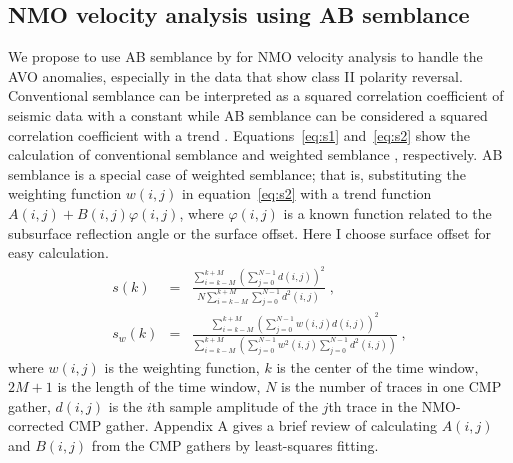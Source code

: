  \subsection{NMO velocity analysis using AB semblance}
 We propose to use AB semblance by \cite{Fomel09} for NMO velocity analysis to handle the AVO anomalies, especially in the data that show class II polarity reversal. Conventional semblance can be interpreted as a squared correlation coefficient of seismic data with a constant while AB semblance can be considered a squared correlation coefficient with a trend \cite[]{Fomel09}.
Equations~\ref{eq:s1} and~\ref{eq:s2} show the
calculation of conventional semblance \cite[]{Neidell71}
and weighted semblance \cite[]{Chen15}, respectively. 
AB semblance is a special case of weighted semblance; that is, substituting the weighting function $w(i,j)$
in equation~\ref{eq:s2} with a trend function $A(i,j)+B(i,j)\varphi(i,j)$, where $\varphi(i,j)$
is a known function related to the subsurface reflection angle or the
surface offset. Here I choose surface offset for easy calculation.
      \begin{eqnarray}
         \label{eq:s1}
          s(k) & = & \frac{\displaystyle\sum_{i=k-M}^{k+M}\left(\displaystyle
          \sum_{j=0}^{N-1}d(i,j)\right)^2}{N\displaystyle\sum_{i=k-M}^{k+M}\displaystyle
          \sum_{j=0}^{N-1}d^2(i,j)} \;, \\
          \label{eq:s2}
          s_{w}(k) & = & \frac{\displaystyle\sum_{i=k-M}^{k+M}\left(\displaystyle
          \sum_{j=0}^{N-1}w(i,j)d(i,j)\right)^2}{\displaystyle\sum_{i=k-M}^{k+M}
          \left(\displaystyle\sum_{j=0}^{N-1}w^2(i,j)\displaystyle\sum_{j=0}^{N-1}d^2(i,j)\right)} \;,
      \end{eqnarray}
where $w(i,j)$ is the weighting function, $k$ is the center of the
time window, $2M+1$ is the length of the time window, $N$ is
the number of traces in one CMP gather, $d(i,j)$ is the $i$th
sample amplitude of the $j$th trace in the NMO-corrected
CMP gather. Appendix A gives a brief review of calculating $A(i,j)$ and $B(i,j)$ from the CMP gathers by least-squares fitting. 

